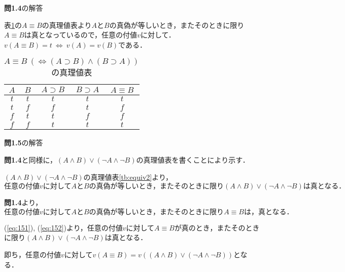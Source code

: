 \documentclass[11pt,dvipdfmx]{jreport}
\begin{document}
\par
\vspace{5mm}

\noindent \textbf{問1.4}の解答 \par 
表\ref{tb:equiv}の$A \equiv B$の真理値表より$A$と$B$の真偽が等しいとき，またそのときに限り$A \equiv B$は真となっているので，任意の付値$v$に対して．$v(A \equiv B) = t \  \Longleftrightarrow \ v(A) = v(B)$である．

\begin{table}[!htbp]
  \centering
  \caption{$A \equiv B \ (\Longleftrightarrow (A \supset B) \land (B \supset A))$の真理値表}
  \vspace{3mm}
  \begin{tabular}{c|c|c|c|c}
    $A$ & $B$ & $A \supset B$ & $B \supset A$ & $A \equiv B$ \\ \hline
    $t$ & $t$ & $t$ & $t$ & $t$  \\ \hline
    $t$ & $f$ & $f$ & $t$ & $f$  \\ \hline
    $f$ & $t$ & $t$ & $f$ & $f$  \\ \hline
    $f$ & $f$ & $t$ & $t$ & $t$  \\ 
  \end{tabular}
  \label{tb:equiv}
\end{table}

\par
\vspace{5mm}

\noindent \textbf{問1.5}の解答 \par 
\textbf{問1.4}と同様に，$(A \land B) \lor (\lnot A \land \lnot B)$の真理値表を書くことにより示す．
\par
$(A \land B) \lor (\lnot A \land \lnot B)$の真理値表\ref{tb:equiv2}より，
\begin{equation}
\textrm{任意の付値$v$に対して$A$と$B$の真偽が等しいとき，またそのときに限り$(A \land B) \lor (\lnot A \land \lnot B)$は真となる．}
 \label{eq:151}
\end{equation}
\par
\textbf{問1.4}より，
\begin{equation}
\textrm{任意の付値$v$に対して$A$と$B$の真偽が等しいとき，またそのときに限り$A \equiv B$は，真となる．}
 \label{eq:152}
\end{equation}
\par
(\ref{eq:151}), (\ref{eq:152})より，任意の付値$v$に対して$A \equiv B$が真のとき，またそのときに限り$(A \land B) \lor (\lnot A \land \lnot B)$は真となる．
\par
即ち，任意の付値$v$に対して$v(A \equiv B) = v((A \land B) \lor (\lnot A \land \lnot B))$となる．
\end{document}
